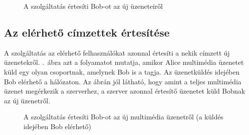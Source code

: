 \begin{figure}[htb]
\center
{}
\caption{A szolgáltatás értesíti Bob-ot az új üzeneteiről}
\label{fig:teszt-vtf-ertesites-01}
\end{figure}

\subsection{Az elérhető címzettek értesítése}
\label{sec:teszteles_notify}

A szolgáltatás az elérhető felhasználókat azonnal értesíti a nekik címzett új üzenetekről. .~ábra azt a folyamatot mutatja, amikor Alice multimédia üzenetet küld egy olyan csoportnak, amelynek Bob is a tagja. Az üzenetküldés idejében Bob elérhető a hálózaton. Az ábrán jól látható, hogy amint a teljes multimédia üzenet megérkezik a szerverhez, a szerver azonnal értesítő üzenetet küld Bobnak az új üzenetről.
\begin{figure}[htb]
\center
{}
\caption{A szolgáltatás értesíti Bob-ot az új multimédia üzenetről (a küldés idejében Bob elérhető)}
\label{fig:teszt-vtf-ertesites-02}
\end{figure}

